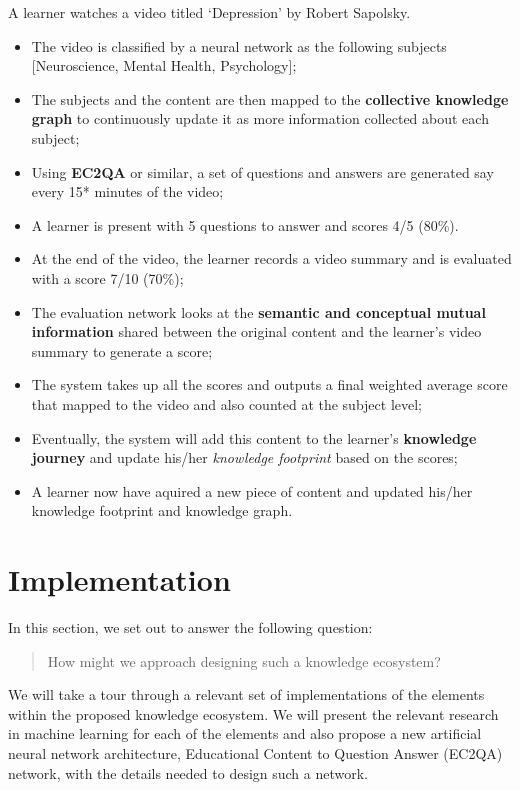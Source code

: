 \documentclass[]{book}
\theoremstyle{definition}
\theoremstyle{definition}
\theoremstyle{definition}
\theoremstyle{remark}
\begin{document}
A learner watches a video titled `Depression' by Robert Sapolsky.

\begin{itemize}
\item
  The video is classified by a neural network as the following subjects
  {[}Neuroscience, Mental Health, Psychology{]};
\item
  The subjects and the content are then mapped to the \textbf{collective
  knowledge graph} to continuously update it as more information
  collected about each subject;
\item
  Using \textbf{EC2QA} or similar, a set of questions and answers are
  generated say every 15* minutes of the video;
\item
  A learner is present with 5 questions to answer and scores 4/5 (80\%).
\item
  At the end of the video, the learner records a video summary and is
  evaluated with a score 7/10 (70\%);
\item
  The evaluation network looks at the \textbf{semantic and conceptual
  mutual information} shared between the original content and the
  learner's video summary to generate a score;
\item
  The system takes up all the scores and outputs a final weighted
  average score that mapped to the video and also counted at the subject
  level;
\item
  Eventually, the system will add this content to the learner's
  \textbf{knowledge journey} and update his/her \emph{knowledge
  footprint} based on the scores;
\item
  A learner now have aquired a new piece of content and updated his/her
  knowledge footprint and knowledge graph.
\end{itemize}

\chapter{Implementation}\label{implementation}

In this section, we set out to answer the following question:

\begin{quote}
How might we approach designing such a knowledge ecosystem?
\end{quote}

We will take a tour through a relevant set of implementations of the
elements within the proposed knowledge ecosystem. We will present the
relevant research in machine learning for each of the elements and also
propose a new artificial neural network architecture, Educational
Content to Question Answer (EC2QA) network, with the details needed to
design such a network.
\end{document}
